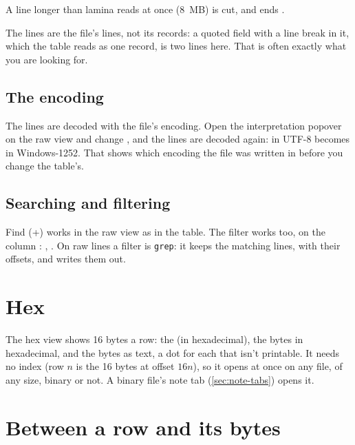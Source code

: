 A line longer than lamina reads at once (8~MB) is cut, and ends .

The lines are the file's lines, not its records: a quoted field with a line break in it, which the table
reads as one record, is two lines here. That is often exactly what you are looking for.

\subsection{The encoding}\label{sec:raw-encoding}

The lines are decoded with the file's encoding. Open the interpretation popover on the raw view and change
, and the lines are decoded again:  in UTF-8 becomes  in
Windows-1252. That shows which encoding the file was written in before you change the table's.

\subsection{Searching and filtering}

Find (+) works in the raw view as in the table. The filter works too, on the column
: , . On raw lines
a filter is \texttt{grep}: it keeps the matching lines, with their offsets, and  writes
them out.

\section{Hex}\label{sec:raw-hex}

The hex view shows 16 bytes a row: the  (in hexadecimal), the bytes in hexadecimal, and the
bytes as text, a dot for each that isn't printable. It needs no index (row $n$ is the 16 bytes at offset
$16n$), so it opens at once on any file, of any size, binary or not. A binary file's note tab
(\cref{sec:note-tabs}) opens it.

\section{Between a row and its bytes}\label{sec:raw-jumps}

